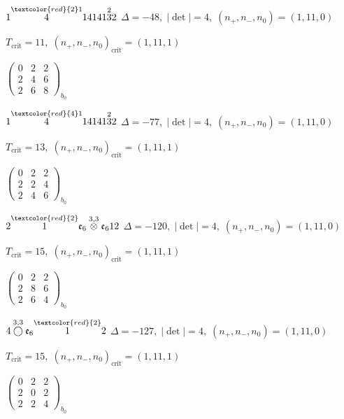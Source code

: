 \documentclass[10pt]{article}
\begin{document}
$1\overset{\textcolor{red}{2}1}{4}14141\overset{2}{3}2$ \quad $\Delta=-48,\; |\det|=4,\; (n_+,n_-,n_0)=(1,11,0)$

\hspace{1em}$T_{\text{crit}}=11,\; (n_+,n_-,n_0)_{\text{crit}}=(1,11,1)$

\hspace{2em}$\left(\begin{smallmatrix}0 & 2 & 2 \\ 2 & 4 & 6 \\ 2 & 6 & 8\end{smallmatrix}\right)_{\!b_0}$

$1\overset{\textcolor{red}{4}1}{4}14141\overset{2}{3}2$ \quad $\Delta=-77,\; |\det|=4,\; (n_+,n_-,n_0)=(1,11,0)$

\hspace{1em}$T_{\text{crit}}=13,\; (n_+,n_-,n_0)_{\text{crit}}=(1,11,1)$

\hspace{2em}$\left(\begin{smallmatrix}0 & 2 & 2 \\ 2 & 2 & 4 \\ 2 & 4 & 6\end{smallmatrix}\right)_{\!b_0}$

\smallskip

$2\overset{\textcolor{red}{2}}{1}\mathfrak{e}_6\overset{3,3}{\otimes}\mathfrak{e}_612$ \quad $\Delta=-120,\; |\det|=4,\; (n_+,n_-,n_0)=(1,11,0)$

\hspace{1em}$T_{\text{crit}}=15,\; (n_+,n_-,n_0)_{\text{crit}}=(1,11,1)$

\hspace{2em}$\left(\begin{smallmatrix}0 & 2 & 2 \\ 2 & 8 & 6 \\ 2 & 6 & 4\end{smallmatrix}\right)_{\!b_0}$

\smallskip

$4\overset{3,3}{\bigcirc}\mathfrak{e}_6\overset{\textcolor{red}{2}}{1}2$ \quad $\Delta=-127,\; |\det|=4,\; (n_+,n_-,n_0)=(1,11,0)$

\hspace{1em}$T_{\text{crit}}=15,\; (n_+,n_-,n_0)_{\text{crit}}=(1,11,1)$

\hspace{2em}$\left(\begin{smallmatrix}0 & 2 & 2 \\ 2 & 0 & 2 \\ 2 & 2 & 4\end{smallmatrix}\right)_{\!b_0}$
\end{document}
